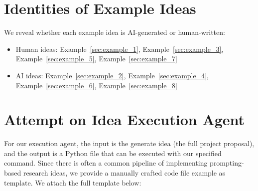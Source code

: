 \newpage 



\section{Identities of Example Ideas}
\label{sec:identity}

We reveal whether each example idea is AI-generated or human-written:

\begin{itemize}
    \item Human ideas: 
    Example~\ref{sec:example_1}, Example~\ref{sec:example_3}, Example~\ref{sec:example_5}, Example~\ref{sec:example_7}

    \item AI ideas: 
    Example~\ref{sec:example_2}, Example~\ref{sec:example_4}, Example~\ref{sec:example_6}, Example~\ref{sec:example_8}
\end{itemize}


\newpage 

\section{Attempt on Idea Execution Agent}
\label{sec:failed_attempts}

For our execution agent, the input is the generate idea (the full project proposal), and the output is a Python file that can be executed with our specified command. 
Since there is often a common pipeline of implementing prompting-based research ideas, we provide a manually crafted code file example as template. We attach the full template below: 


